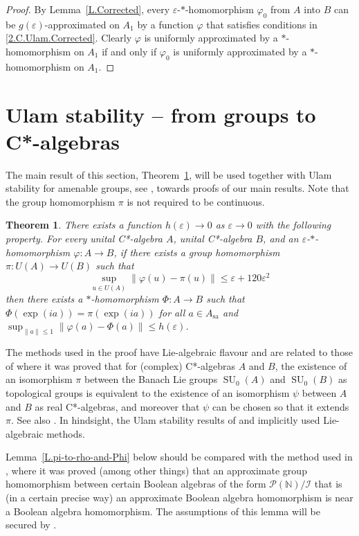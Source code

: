 \documentclass[11pt]{amsproc}
\newcommand{\bbN}{\mathbb N}
\DeclareMathOperator{\SU}{SU}
\newcommand{\cstar}{C*}
\newcommand{\cP}{\mathcal P}
\newcommand{\cI}{\mathcal I}
\theoremstyle{definition}
\theoremstyle{plain}
\newtheorem{theorem}[definition]{Theorem}
\theoremstyle{remark}
\begin{document}
\begin{proof}
	By Lemma~\ref{L.Corrected}, every $\varepsilon$-$*$-homomorphism $\varphi_0$ from $A$ into $B$ can be $g(\varepsilon)$-approximated on $A_1$ by a function $\varphi$ that satisfies  conditions in \eqref{2.C.Ulam.Corrected}. Clearly $\varphi$ is uniformly approximated by a $*$-homomorphism on $A_1$ if and only if $\varphi_0$ is uniformly approximated by a $*$-homomorphism on $A_1$. 
\end{proof}

\section{Ulam stability -- from groups to \cstar-algebras}\label{S.Groups}

The main result of this section, Theorem~\ref{T.Ulam2}, will be used together with  Ulam stability for amenable groups, see \cite{BMT,Kaz:epsilon}, towards proofs of our main results. 
Note that the group homomorphism $\pi$ is not required to be continuous. 


\begin{theorem}\label{T.Ulam2}
	There exists a function $h(\varepsilon)\to 0$ as $\varepsilon\to 0$ with the following property. 
	For every unital  \cstar-algebra $A$, unital \cstar-algebra $B$,  and an $\varepsilon$-$*$-homomorphism $\varphi\colon A \to B$, if there exists a group homomorphism $\pi\colon U(A)\to U(B)$ such that 
	\[
	\sup_{u\in U(A)} \|\varphi(u)-\pi(u)\|\leq \varepsilon+120\varepsilon^2
	\] 
	then  there exists a $*$-homomorphism $\Phi\colon A\to B$ such that $\Phi(\exp(ia))=\pi(\exp(ia))$ for all $a\in A_{\textrm{sa}}$ and 
	$\sup_{\|a\|\le 1}\|\varphi(a)-\Phi(a)\|\le h(\varepsilon)$.
\end{theorem}

The methods used in the proof have Lie-algebraic flavour and are related to those of \cite[Theorem~1.1]{fogang2024distinguishing}  where it was proved
that for (complex) \cstar-algebras $A$ and $B$, 
the existence of an isomorphism $\pi$ between  the Banach Lie groups  $\SU_0(A)$ and $\SU_0(B)$ as topological groups is equivalent to the existence of an isomorphism $\psi$ between $A$ and $B$ as real \cstar-algebras, and moreover that $\psi$ can be chosen so that it extends $\pi$. See also \cite{ando2025Lie}. In hindsight, the Ulam stability results of \cite{MV} and \cite{Fa:All} implicitly used Lie-algebraic methods. 



Lemma~\ref{L.pi-to-rho-and-Phi} below should be compared with the method used in \cite{KanRe:Ulam}, where it was proved (among other things) that an approximate group homomorphism between certain Boolean algebras of the form $\cP(\bbN)/\cI$  that is (in a certain precise way) an approximate Boolean algebra homomorphism  is near a Boolean algebra homomorphism. 
The assumptions of this lemma will be secured by \cite[Theorem~2.1]{BMT}. 
\end{document}
